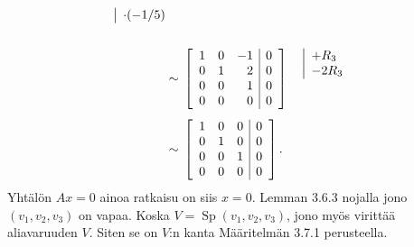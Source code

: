 \documentclass[11pt,a4paper]{amsart}
\begin{document}
\begin{solution}
\begin{enumerate}[label=(\alph*), leftmargin=*]
\[\begin{aligned}
\begin{array}{@{}l@{}}
            {} \\
            {} \\
            \smash{\rowop{\cdot(-1/5)}} \\
            {}
          \end{array}
          \\[1ex]
          &\sim{}
          \left[
            \begin{array}{rrr|r}
              1 & 0 & -1 & 0 \\
              0 & 1 & 2 & 0 \\
              0 & 0 & 1 & 0 \\
              0 & 0 & 0 & 0
            \end{array}
          \right]
          \quad
          \begin{array}{@{}l@{}}
            \smash{\rowop{+R_3}} \\
            \smash{\rowop{-2R_3}} \\
            {} \\
            {}
          \end{array}
          \\[1ex]
          &\sim{}
          \left[
            \begin{array}{rrr|r}
              1 & 0 & 0 & 0 \\
              0 & 1 & 0 & 0 \\
              0 & 0 & 1 & 0 \\
              0 & 0 & 0 & 0
            \end{array}
          \right].
        \end{aligned}
      \]
      Yhtälön \(Ax=0\) ainoa ratkaisu on siis \(x=0\).
      Lemman 3.6.3 nojalla jono \((v_1,v_2,v_3)\) on vapaa.
      Koska \(V=\operatorname{Sp}(v_1,v_2,v_3)\), jono myös
      virittää aliavaruuden \(V\). Siten se on \(V\):n kanta
      Määritelmän 3.7.1 perusteella.

      \newpage


\end{enumerate}
\end{solution}
\end{document}
